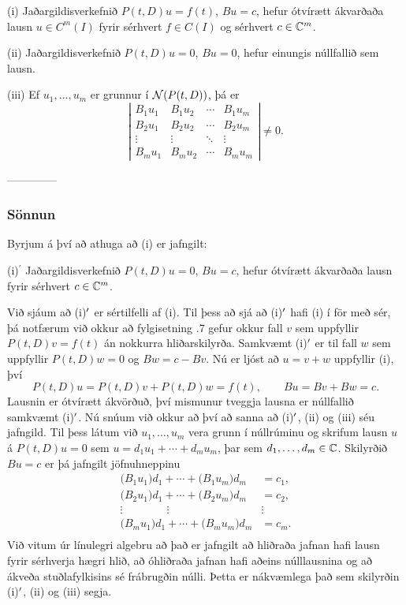 \item{(i)} Jaðargildisverkefnið $P(t,D)u=f(t)$, $Bu=c$,
hefur ótvírætt ákvarðaða lausn $u\in C^m(I)$ fyrir sérhvert $f\in C(I)$
og sérhvert $c\in {\mathbb C}^m$.
\item{(ii)} Jaðargildisverkefnið $P(t,D)u=0$, $Bu=0$,
hefur einungis núllfallið sem lausn.
\item{(iii)}  Ef $u_1,\dots,u_m$ er grunnur í ${\cal N}(P(t,D))$, þá er
$$
\left|\begin{matrix} B_1u_1 & B_1u_2 & \cdots & B_1u_m\\
B_2u_1 & B_2u_2 & \cdots & B_2u_m\\
\vdots & \vdots &\ddots & \vdots \\
B_mu_1 & B_mu_2 & \cdots & B_mu_m
\end{matrix}\right|\neq 0.
$$



--------------



\subsubsection{Sönnun}
Byrjum á því að athuga að (i) er jafngilt:

\item{(i)$^\prime$} Jaðargildisverkefnið 
$P(t,D)u=0$, $Bu=c$,
hefur ótvírætt ákvarðaða lausn fyrir sérhvert $c\in {\mathbb C}^m$.

Við sjáum að (i)${\sp{\prime}}$ er sértilfelli af (i).  Til þess að sjá að
(i)${\sp{\prime}}$ hafi (i) í för með sér,  þá notfærum við okkur að
fylgisetning .7 gefur okkur fall $v$ sem uppfyllir
$P(t,D)v=f(t)$ án nokkurra hliðarskilyrða.  Samkvæmt (i)${\sp{\prime}}$ er til
fall $w$ sem uppfyllir $P(t,D)w=0$ og $Bw=c-Bv$.  Nú er ljóst að $u=v+w$
uppfyllir (i), því 
$$
P(t,D)u=P(t,D)v+P(t,D)w=f(t), \qquad Bu=Bv+Bw=c.
$$
Lausnin er ótvírætt ákvörðuð, því mismunur tveggja lausna er núllfallið
samkvæmt (i)${\sp{\prime}}$.
Nú snúum við okkur að því að sanna að (i)${\sp{\prime}}$, (ii) og (iii) séu
jafngild. Til þess látum við
$u_1,\dots,u_m$ vera grunn í núllrúminu og skrifum lausn $u$ á
$P(t,D)u=0$ sem $u=d_1u_1+\cdots+d_mu_m$, þar sem $d_1,\dots,d_m\in {\mathbb C}$.
Skilyrðið $Bu=c$ er þá jafngilt jöfnuhneppinu
\begin{align*}
\big(B_1u_1)d_1+\cdots+\big(B_1u_m\big)d_m &=c_1,\\
\big(B_2u_1)d_1+\cdots+\big(B_2u_m\big)d_m &=c_2,\\
\vdots\qquad\qquad\vdots\qquad\qquad & \vdots \\
\big(B_mu_1)d_1+\cdots+\big(B_mu_m\big)d_m &=c_m.\\
\end{align*}
Við vitum úr línulegri algebru að það er jafngilt að hliðraða jafnan
hafi lausn fyrir sérhverja hægri hlið, 
að óhliðraða jafnan hafi aðeins núlllausnina og að
ákveða stuðlafylkisins sé frábrugðin núlli.  Þetta er nákvæmlega það
sem skilyrðin (i)${\sp{\prime}}$, (ii) og (iii) segja.


